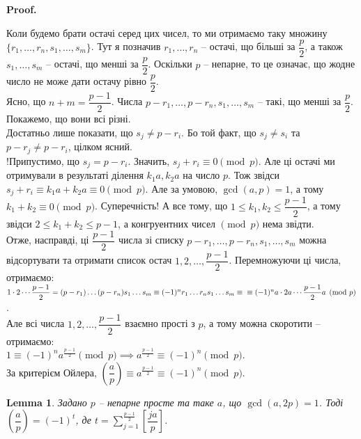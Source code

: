 \documentclass[a4paper, 10pt]{article}
\makeatletter
\theoremstyle{theoremdd}
\theoremstyle{theoremdd}
\theoremstyle{theoremdd}
\theoremstyle{theoremdd}
\theoremstyle{theoremdd}
\theoremstyle{theoremdd}
\theoremstyle{theoremdd}
\newtheorem{lemma}[theorem]{Lemma}
\theoremstyle{theoremdd}
\renewenvironment{proof}[1][Proof.\\]{\par
\pushQED{\hfill \qed}%
\normalfont \topsep6\p@\@plus6\p@\relax
\trivlist
\item\relax
{\bfseries
#1\@addpunct{.}}\hspace\labelsep\ignorespaces
}{%
\popQED\endtrivlist\@endpefalse
}
\makeatother
\begin{document}
\begin{proof}
Коли будемо брати остачі серед цих чисел, то ми отримаємо таку множину $\{r_1,\dots,r_n,s_1,\dots,s_m\}$. Тут я позначив $r_1,\dots,r_n$ -- остачі, що більші за $\dfrac{p}{2}$, а також $s_1,\dots,s_m$ -- остачі, що менші за $\dfrac{p}{2}$. Оскільки $p$ -- непарне, то це означає, що жодне число не може дати остачу рівно $\dfrac{p}{2}$.\\
Ясно, що $n+m = \dfrac{p-1}{2}$. Числа $p-r_1,\dots,p-r_n,s_1,\dots,s_m$ -- такі, що менші за $\dfrac{p}{2}$. Покажемо, що вони всі різні.\\
Достатньо лише показати, що $s_j \neq p-r_i$. Бо той факт, що $s_j \neq s_i$ та $p-r_j \neq p-r_i$, цілком ясний.\\
!Припустимо, що $s_j = p-r_i$. Значить, $s_j + r_i \equiv 0 \pmod p$. Але ці остачі ми отримували в результаті ділення $k_1a, k_2a$ на число $p$. Тож звідси $s_j + r_i \equiv k_1a+k_2a \equiv 0 \pmod p$. Але за умовою, $\gcd(a,p)=1$, а тому $k_1+k_2 \equiv 0 \pmod p$. Суперечність! А все тому, що $1 \leq k_1,k_2 \leq \dfrac{p-1}{2}$, а тому звідси $2 \leq k_1+k_2 \leq p-1$, а конгруентних чисел $\pmod p$ нема звідти.\\
Отже, насправді, ці $\dfrac{p-1}{2}$ числа зі списку $p-r_1,\dots,p-r_n,s_1,\dots,s_m$ можна відсортувати та отримати список остач $1,2,\dots,\dfrac{p-1}{2}$. Перемножуючи ці числа, отримаємо:\\
$1 \cdot 2 \cdots \dfrac{p-1}{2} = (p-r_1) \dots (p-r_n) s_1 \dots s_m \equiv (-1)^n r_1 \dots r_n s_1 \dots s_m \equiv \\
\equiv (-1)^n a \cdot 2a \cdots \dfrac{p-1}{2}a \pmod p$.\\
Але всі числа $1,2,\dots,\dfrac{p-1}{2}$ взаємно прості з $p$, а тому можна скоротити -- отримаємо:\\
$1 \equiv (-1)^n a^{\textstyle\frac{p-1}{2}} \pmod p \implies a^{\textstyle\frac{p-1}{2}} \equiv (-1)^n \pmod p$.\\
За критерієм Ойлера, $\left( \dfrac{a}{p} \right) \equiv a^{\textstyle\frac{p-1}{2}} \equiv (-1)^n \pmod p$.
\end{proof}

\begin{lemma}
Задано $p$ -- непарне просте та таке $a$, що $\gcd(a,2p) = 1$. Тоді $\left( \dfrac{a}{p} \right) = (-1)^t$, де $t = \displaystyle\sum_{j=1}^{\frac{p-1}{2}} \left[ \dfrac{ja}{p} \right]$.
\end{lemma}
\end{document}
